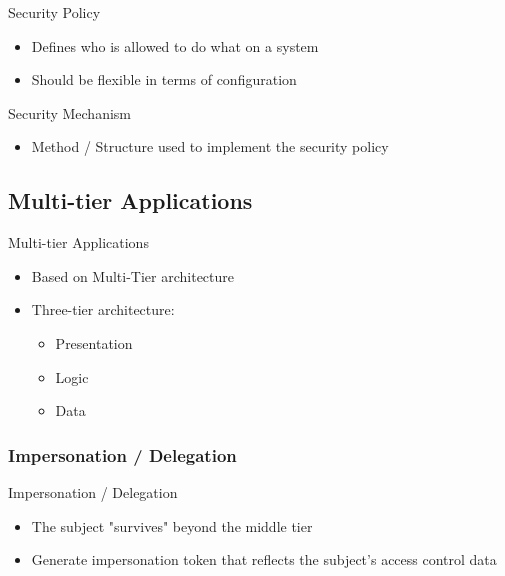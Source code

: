 \begin{definition}{Security Policy}\\
    \begin{itemize}
        \item Defines who is allowed to do what on a system
        \item Should be flexible in terms of configuration
    \end{itemize}
\end{definition}

\begin{definition}{Security Mechanism}\\
    \begin{itemize}
        \item Method / Structure used to implement the security policy
    \end{itemize}
\end{definition}

\subsection{Multi-tier Applications}

\begin{concept}{Multi-tier Applications}\\
    \begin{itemize}
        \item Based on Multi-Tier architecture
        \item Three-tier architecture:
        \begin{itemize}
            \item Presentation
            \item Logic  
            \item Data
        \end{itemize}
    \end{itemize}
\end{concept}

\subsubsection{Impersonation / Delegation}

\begin{definition}{Impersonation / Delegation}\\
    \begin{itemize}
        \item The subject "survives" beyond the middle tier
        \item Generate impersonation token that reflects the subject's access control data
    \end{itemize}
    
\end{definition}

